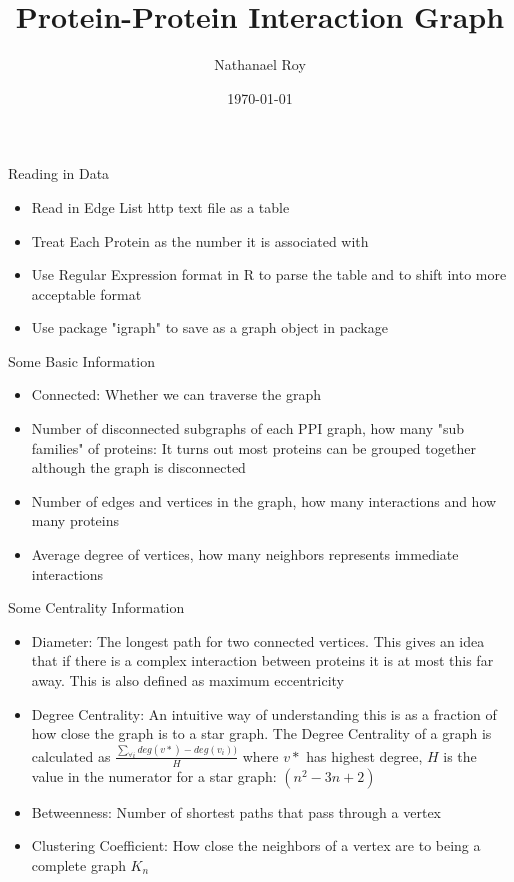 \documentclass[xcolor=table]{beamer}
\title[PPI Graphs]{Protein-Protein Interaction Graph} %
\author{Nathanael Roy} %
\institute[UCR] %
{
University of California, Riverside \\ %
\medskip
}
\date{\today} %
\begin{document}
\begin{frame}
\titlepage %
\end{frame}

\begin{frame}{Reading in Data}
    \begin{itemize}
        \item Read in Edge List http text file as a table
        \item Treat Each Protein as the number it is associated with
        \item Use Regular Expression format in R to parse the table and to shift into more acceptable format
        \item Use package "igraph" to save as a graph object in package
    \end{itemize}
\end{frame}

\begin{frame}{Some Basic Information}
\begin{itemize}
    \item Connected: Whether we can traverse the graph
    \item Number of disconnected subgraphs of each PPI graph, how many "sub families" of proteins: It turns out most proteins can be grouped together although the graph is disconnected
    \item Number of edges and vertices in the graph, how many interactions and how many proteins
    \item Average degree of vertices, how many neighbors represents immediate interactions
\end{itemize}
\end{frame}

\begin{frame}{Some Centrality Information}
\begin{itemize}
    \item Diameter: The longest path for two connected vertices. This gives an idea that if there is a complex interaction between proteins it is at most this far away. This is also defined as maximum eccentricity
    \item Degree Centrality: An intuitive way of understanding this is as a fraction of how close the graph is to a star graph. The Degree Centrality of a graph is calculated as $\frac{\sum_{\forall i} deg(v*)-deg(v_i))}{H}$ where $v*$ has highest degree,  $H$ is the value in the numerator for a star graph: $(n^2-3n+2)$
    \item Betweenness: Number of shortest paths that pass through a vertex
    \item Clustering Coefficient: How close the neighbors of a vertex are to being a complete graph $K_n$
\end{itemize}
\end{frame}
\end{document}
